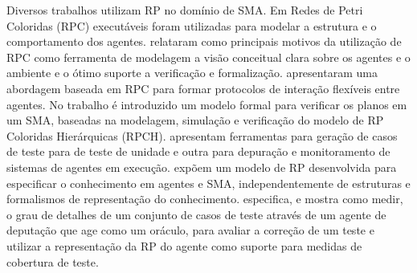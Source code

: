 Diversos trabalhos utilizam RP no domínio de SMA. Em \cite{kohler2001modelling} Redes de Petri Coloridas (RPC) executáveis foram utilizadas para modelar a estrutura e o comportamento dos agentes. \citet{weyns2002colored} relataram como principais motivos da utilização de RPC como ferramenta de modelagem a visão conceitual clara sobre os agentes e o ambiente e o ótimo suporte a verificação e formalização. \cite{bai2004colored} apresentaram uma abordagem baseada em RPC para formar protocolos de interação flexíveis entre agentes. No trabalho \cite{de2004formal} é introduzido um modelo formal para verificar os planos em um SMA, baseadas na modelagem, simulação e verificação do modelo de RP Coloridas Hierárquicas (RPCH). \cite{poutakidis2009debugging} apresentam ferramentas para geração de casos de teste para de teste de unidade e outra para depuração e monitoramento de sistemas de agentes em execução. \citet{goncalves2010approach} expõem um modelo de RP desenvolvida para especificar o conhecimento em agentes e SMA, independentemente de estruturas e formalismos de representação do conhecimento. \cite{miller2011test} especifica, e mostra como medir, o grau de detalhes de um conjunto de casos de teste através de um agente de deputação que age como um oráculo, para avaliar a correção de um teste e utilizar a representação da RP do agente como suporte para medidas de cobertura de teste.





























